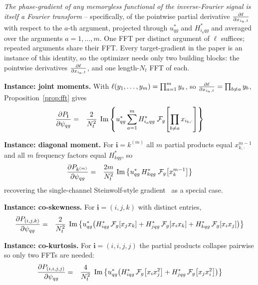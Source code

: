 \documentclass[10pt,a4paper]{article}
\numberwithin{equation}{section}
\DeclarePairedDelimiter\block{[}{]}
\DeclarePairedDelimiter\mat{(}{)}
\DeclareMathOperator{\Imag}{Im}
\newcommand{\im}[1]{\Imag\left\{#1\right\}}
\begin{document}
\emph{The phase-gradient of any memoryless functional of the inverse-Fourier signal is itself a Fourier transform} -- specifically, of the pointwise partial derivative $\frac{\partial \ell}{\partial x_{i_a,t}}$ with respect to the $a$-th argument, projected through $u_{q g}^*$ and $H_{i_a q g}^*$ and averaged over the arguments $a=1,\ldots,m$. One FFT per distinct argument of $\ell$ suffices; repeated arguments share their FFT. 
Every target-gradient in the paper is an instance of this identity, so the optimizer needs only two building blocks: the pointwise derivatives $\frac{\partial \ell}{\partial x_{i_a,t}}$, and one length-$N_t$ FFT of each.

\textbf{Instance: joint moments.} With $\ell\mat{y_1,\ldots,y_m} = \prod_{a=1}^{m} y_a$, so $\frac{\partial \ell}{\partial x_{i_a,t}} = \prod_{b\neq a} y_b$, Proposition~\ref{prop:fft} gives
\begin{eqnarray}
\frac{\partial P_\mathbf{i}}{\partial \psi_{q g}}
	&=& \frac{2}{N_t^2}\;\im{u_{q g}^* 
			\sum_{a=1}^{m} H_{i_a q g}^*\;\mathcal{F}_g\block*{\prod_{b\neq a} x_{i_b,\cdot}}}
\end{eqnarray}

\textbf{Instance: diagonal moment.} For $\mathbf{i} = k^{(m)}$ all $m$ partial products equal $x_{k,\cdot}^{m-1}$ and all $m$ frequency factors equal $H_{k q g}^*$, so
\begin{eqnarray}
	\frac{\partial P_{k^{(m)}}}{\partial \psi_{q g}} 
	&=& \frac{2 m}{N_t^2}\,\im{u_{q g}^*\, 
		H_{k q g}^*\;\mathcal{F}_g\block*{x_{k}^{m-1}}}
\end{eqnarray}
recovering the single-channel Steinwolf-style gradient~\cite{steinwolf2011ifft} as a special case.

\textbf{Instance: co-skewness.} For $\mathbf{i}=(i,j,k)$ with distinct entries,
\begin{eqnarray}
	\frac{\partial P_{(i,j,k)}}{\partial \psi_{q g}} 
	&=& \frac{2}{N_t^2}\;\im{u_{q g}^*
			\mat*{H_{i q g}^*\,\mathcal{F}_g\block*{x_j x_k} + 
				  H_{j q g}^*\,\mathcal{F}_g\block*{x_i x_k} + 
				  H_{k q g}^*\,\mathcal{F}_g\block*{x_i x_j} }}
\end{eqnarray}

\textbf{Instance: co-kurtosis.} For $\mathbf{i}=(i,i,j,j)$ the partial products collapse pairwise 
so only two FFTs are needed:
\begin{eqnarray}
	\frac{\partial P_{(i,i,j,j)}}{\partial \psi_{q g}} 
	&=& \frac{4}{N_t^2}\;\im{u_{q g}^*
		\mat*{H_{i q g}^*\,\mathcal{F}_g\block*{x_i x_j^2} + 
			 H_{j q g}^*\,\mathcal{F}_g\block*{x_j x_i^2} }}
\end{eqnarray}
\end{document}
